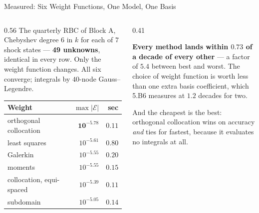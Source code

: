 \begin{frame}{Measured: Six Weight Functions, One Model, One Basis}
\begin{columns}[T]
\begin{column}{0.56\textwidth}
\small
The quarterly RBC of Block A, Chebyshev degree $6$ in $k$ for each of $7$ shock states --- \textbf{49 unknowns}, identical in every row. Only the weight function changes. All six converge; integrals by $40$-node Gauss--Legendre.
\medskip
\begin{center}\footnotesize
\begin{tabularx}{\linewidth}{@{}>{\raggedright\arraybackslash}X r r@{}}
\toprule
\textbf{Weight} & $\max|\mathcal{E}|$ & \textbf{sec} \\
\midrule
orthogonal collocation & $\mathbf{10^{-5.78}}$ & $0.11$ \\
least squares & $10^{-5.61}$ & $0.80$ \\
Galerkin & $10^{-5.55}$ & $0.20$ \\
moments & $10^{-5.55}$ & $0.15$ \\
collocation, equi-spaced & $10^{-5.39}$ & $0.11$ \\
subdomain & $10^{-5.05}$ & $0.14$ \\
\bottomrule
\end{tabularx}
\end{center}
\end{column}
\begin{column}{0.41\textwidth}
\begin{takeawaybox}\footnotesize
\textbf{Every method lands within $0.73$ of a decade of every other} --- a factor of $5.4$ between
best and worst. The choice of weight function is worth less than one extra basis coefficient, which
5.B6 measures at $1.2$ decades for two.
\end{takeawaybox}
\medskip
\begin{examplebox}\footnotesize
And the cheapest is the best: orthogonal collocation wins on accuracy \emph{and} ties for fastest, because it evaluates no integrals at all.
\end{examplebox}
\end{column}
\end{columns}
\vspace{1mm}
\end{frame}

